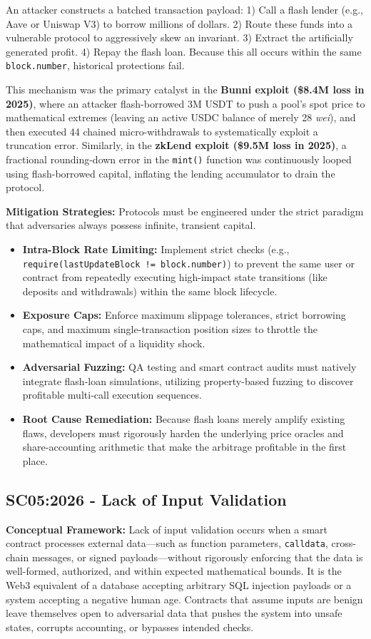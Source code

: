 An attacker constructs a batched transaction payload: 1) Call a flash lender (e.g., Aave or Uniswap V3) to borrow millions of dollars. 2) Route these funds into a vulnerable protocol to aggressively skew an invariant. 3) Extract the artificially generated profit. 4) Repay the flash loan. Because this all occurs within the same \texttt{block.number}, historical protections fail. 

This mechanism was the primary catalyst in the \textbf{Bunni exploit (\$8.4M loss in 2025)}, where an attacker flash-borrowed 3M USDT to push a pool's spot price to mathematical extremes (leaving an active USDC balance of merely 28 \textit{wei}), and then executed 44 chained micro-withdrawals to systematically exploit a truncation error. Similarly, in the \textbf{zkLend exploit (\$9.5M loss in 2025)}, a fractional rounding-down error in the \texttt{mint()} function was continuously looped using flash-borrowed capital, inflating the lending accumulator to drain the protocol.

\textbf{Mitigation Strategies:} Protocols must be engineered under the strict paradigm that adversaries always possess infinite, transient capital.
\begin{itemize}
    \item \textbf{Intra-Block Rate Limiting:} Implement strict checks (e.g., \texttt{require(lastUpdateBlock != block.number)}) to prevent the same user or contract from repeatedly executing high-impact state transitions (like deposits and withdrawals) within the same block lifecycle.
    \item \textbf{Exposure Caps:} Enforce maximum slippage tolerances, strict borrowing caps, and maximum single-transaction position sizes to throttle the mathematical impact of a liquidity shock.
    \item \textbf{Adversarial Fuzzing:} QA testing and smart contract audits must natively integrate flash-loan simulations, utilizing property-based fuzzing to discover profitable multi-call execution sequences.
    \item \textbf{Root Cause Remediation:} Because flash loans merely amplify existing flaws, developers must rigorously harden the underlying price oracles and share-accounting arithmetic that make the arbitrage profitable in the first place.
\end{itemize}

\subsection{SC05:2026 - Lack of Input Validation}
\textbf{Conceptual Framework:} Lack of input validation occurs when a smart contract processes external data—such as function parameters, \texttt{calldata}, cross-chain messages, or signed payloads—without rigorously enforcing that the data is well-formed, authorized, and within expected mathematical bounds. It is the Web3 equivalent of a database accepting arbitrary SQL injection payloads or a system accepting a negative human age. Contracts that assume inputs are benign leave themselves open to adversarial data that pushes the system into unsafe states, corrupts accounting, or bypasses intended checks.

